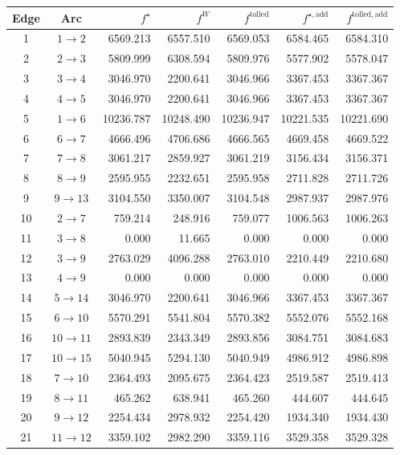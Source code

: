 \documentclass[11pt,a4paper]{article}
\begin{document}
\begin{table}[h]
\centering
\scriptsize
\begin{tabular}{c|c|r|r|r|r|r}
\hline
Edge & Arc & \(f^\star\) & \(f^{W}\) & \(f^{\mathrm{tolled}}\) &
\(f^{\star,\mathrm{add}}\) & \(f^{\mathrm{tolled,add}}\)\\
\hline
1 & \(1\to2\) & 6569.213 & 6557.510 & 6569.053 & 6584.465 & 6584.310\\
2 & \(2\to3\) & 5809.999 & 6308.594 & 5809.976 & 5577.902 & 5578.047\\
3 & \(3\to4\) & 3046.970 & 2200.641 & 3046.966 & 3367.453 & 3367.367\\
4 & \(4\to5\) & 3046.970 & 2200.641 & 3046.966 & 3367.453 & 3367.367\\
5 & \(1\to6\) & 10236.787 & 10248.490 & 10236.947 & 10221.535 & 10221.690\\
6 & \(6\to7\) & 4666.496 & 4706.686 & 4666.565 & 4669.458 & 4669.522\\
7 & \(7\to8\) & 3061.217 & 2859.927 & 3061.219 & 3156.434 & 3156.371\\
8 & \(8\to9\) & 2595.955 & 2232.651 & 2595.958 & 2711.828 & 2711.726\\
9 & \(9\to13\) & 3104.550 & 3350.007 & 3104.548 & 2987.937 & 2987.976\\
10 & \(2\to7\) & 759.214 & 248.916 & 759.077 & 1006.563 & 1006.263\\
11 & \(3\to8\) & 0.000 & 11.665 & 0.000 & 0.000 & 0.000\\
12 & \(3\to9\) & 2763.029 & 4096.288 & 2763.010 & 2210.449 & 2210.680\\
13 & \(4\to9\) & 0.000 & 0.000 & 0.000 & 0.000 & 0.000\\
14 & \(5\to14\) & 3046.970 & 2200.641 & 3046.966 & 3367.453 & 3367.367\\
15 & \(6\to10\) & 5570.291 & 5541.804 & 5570.382 & 5552.076 & 5552.168\\
16 & \(10\to11\) & 2893.839 & 2343.349 & 2893.856 & 3084.751 & 3084.683\\
17 & \(10\to15\) & 5040.945 & 5294.130 & 5040.949 & 4986.912 & 4986.898\\
18 & \(7\to10\) & 2364.493 & 2095.675 & 2364.423 & 2519.587 & 2519.413\\
19 & \(8\to11\) & 465.262 & 638.941 & 465.260 & 444.607 & 444.645\\
20 & \(9\to12\) & 2254.434 & 2978.932 & 2254.420 & 1934.340 & 1934.430\\
21 & \(11\to12\) & 3359.102 & 2982.290 & 3359.116 & 3529.358 & 3529.328\\

\end{tabular}
\end{table}
\end{document}
